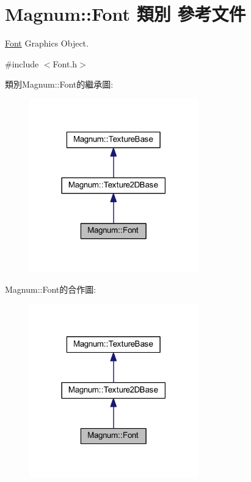 \hypertarget{class_magnum_1_1_font}{}\section{Magnum\+:\+:Font 類別 參考文件}
\label{class_magnum_1_1_font}


\hyperlink{class_magnum_1_1_font}{Font} Graphics Object.  




{\ttfamily \#include $<$Font.\+h$>$}



類別\+Magnum\+:\+:Font的繼承圖\+:\nopagebreak
\begin{figure}[H]
\begin{center}
\leavevmode
\includegraphics[width=207pt]{class_magnum_1_1_font__inherit__graph}
\end{center}
\end{figure}


Magnum\+:\+:Font的合作圖\+:\nopagebreak
\begin{figure}[H]
\begin{center}
\leavevmode
\includegraphics[width=207pt]{class_magnum_1_1_font__coll__graph}
\end{center}
\end{figure}
